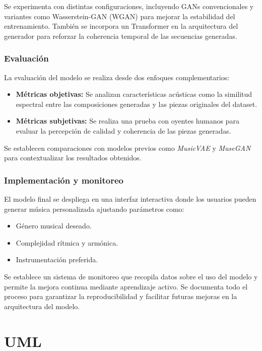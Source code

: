 Se experimenta con distintas configuraciones, incluyendo GANs convencionales y variantes como Wasserstein-GAN (WGAN) para mejorar la estabilidad del entrenamiento. También se incorpora un Transformer en la arquitectura del generador para reforzar la coherencia temporal de las secuencias generadas.

\subsubsection{Evaluación}

La evaluación del modelo se realiza desde dos enfoques complementarios:
\begin{itemize}
    \item \textbf{Métricas objetivas:} Se analizan características acústicas como la similitud espectral entre las composiciones generadas y las piezas originales del dataset.
    \item \textbf{Métricas subjetivas:} Se realiza una prueba con oyentes humanos para evaluar la percepción de calidad y coherencia de las piezas generadas.
\end{itemize}

Se establecen comparaciones con modelos previos como \textit{MusicVAE} y \textit{MuseGAN} para contextualizar los resultados obtenidos.

\subsubsection{Implementación y monitoreo}

El modelo final se despliega en una interfaz interactiva donde los usuarios pueden generar música personalizada ajustando parámetros como:
\begin{itemize}
    \item Género musical deseado.
    \item Complejidad rítmica y armónica.
    \item Instrumentación preferida.
\end{itemize}

Se establece un sistema de monitoreo que recopila datos sobre el uso del modelo y permite la mejora continua mediante aprendizaje activo. Se documenta todo el proceso para garantizar la reproducibilidad y facilitar futuras mejoras en la arquitectura del modelo.

\section{UML}








